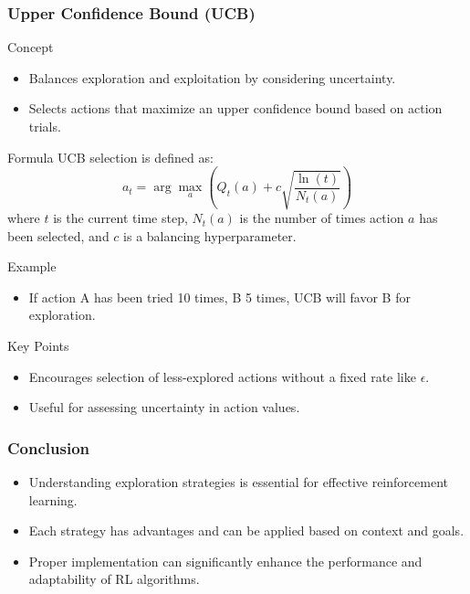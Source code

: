 \documentclass[aspectratio=169]{beamer}
\begin{document}
\begin{frame}[fragile]
    \frametitle{Upper Confidence Bound (UCB)}
    \begin{block}{Concept}
        \begin{itemize}
            \item Balances exploration and exploitation by considering uncertainty.
            \item Selects actions that maximize an upper confidence bound based on action trials.
        \end{itemize}
    \end{block}

    \begin{block}{Formula}
        UCB selection is defined as:
        \begin{equation}
            a_t = \arg\max_a \left( Q_t(a) + c \sqrt{\frac{\ln(t)}{N_t(a)}} \right)
        \end{equation}
        where $t$ is the current time step, $N_t(a)$ is the number of times action $a$ has been selected, and $c$ is a balancing hyperparameter.
    \end{block}

    \begin{block}{Example}
        \begin{itemize}
            \item If action A has been tried 10 times, B 5 times, UCB will favor B for exploration.
        \end{itemize}
    \end{block}

    \begin{block}{Key Points}
        \begin{itemize}
            \item Encourages selection of less-explored actions without a fixed rate like $\epsilon$.
            \item Useful for assessing uncertainty in action values.
        \end{itemize}
    \end{block}
\end{frame}

\begin{frame}[fragile]
    \frametitle{Conclusion}
    \begin{itemize}
        \item Understanding exploration strategies is essential for effective reinforcement learning.
        \item Each strategy has advantages and can be applied based on context and goals.
        \item Proper implementation can significantly enhance the performance and adaptability of RL algorithms.
    \end{itemize}
\end{frame}
\end{document}
